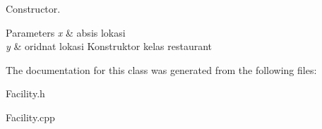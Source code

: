 Constructor. 


\begin{DoxyParams}{Parameters}
{\em x} & absis lokasi \\
\hline
{\em y} & oridnat lokasi Konstruktor kelas restaurant \\
\hline
\end{DoxyParams}


The documentation for this class was generated from the following files\+:\begin{DoxyCompactItemize}
\item 
Facility.\+h\item 
Facility.\+cpp\end{DoxyCompactItemize}
